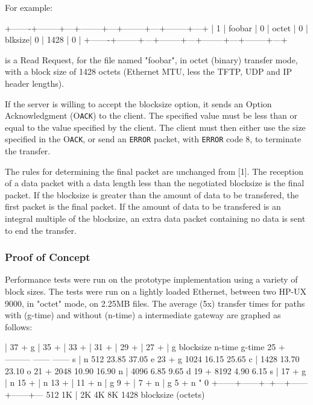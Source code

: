 \documentclass[12pt]{article}
\begin{document}
For example:

   +-------+--------+---+--------+---+--------+---+--------+---+
   |  1  | foobar | 0 | octet | 0 | blksize| 0 | 1428 | 0 |
   +-------+--------+---+--------+---+--------+---+--------+---+

is a Read Request, for the file named "foobar", in octet (binary)
transfer mode, with a block size of 1428 octets (Ethernet MTU, less
the TFTP, UDP and IP header lengths).

If the server is willing to accept the blocksize option, it sends an
Option Acknowledgment (O\verb|ACK|) to the client. The specified value must
be less than or equal to the value specified by the client. The
client must then either use the size specified in the O\verb|ACK|, or send
an  \verb|ERROR| packet, with  \verb|ERROR| code 8, to terminate the transfer.

The rules for determining the final packet are unchanged from [1].
The reception of a data packet with a data length less than the
negotiated blocksize is the final packet. If the blocksize is
greater than the amount of data to be transfered, the first packet is
the final packet. If the amount of data to be transfered is an
integral multiple of the blocksize, an extra data packet containing
no data is sent to end the transfer.

\subsubsection{Proof of Concept}

Performance tests were run on the prototype implementation using a
variety of block sizes. The tests were run on a lightly loaded
Ethernet, between two HP-UX 9000, in "octet" mode, on 2.25MB files.
The average (5x) transfer times for paths with (g-time) and without
(n-time) a intermediate gateway are graphed as follows:

      |
    37 +   g
      |
    35 +
      |
    33 +
      |
    31 +
      |
    29 +
      |
    27 +
      |       g       blocksize  n-time  g-time
    25 +              ---------  ------  ------
   s  |    n           512    23.85  37.05
   e 23 +        g      1024    16.15  25.65
   c  |               1428    13.70  23.10
   o 21 +               2048    10.90  16.90
   n  |               4096    6.85   9.65
   d 19 +               8192    4.90   6.15
   s  |
    17 +          g
      |       n
    15 +
      |        n
    13 +
      |
    11 +          n
      |              g
     9 +
      |
     7 +              n
      |                 g
     5 +                 n
      "
     0 +------+------+--+---+------+------+---
         512  1K | 2K   4K   8K
             1428
          blocksize (octets)
\end{document}
